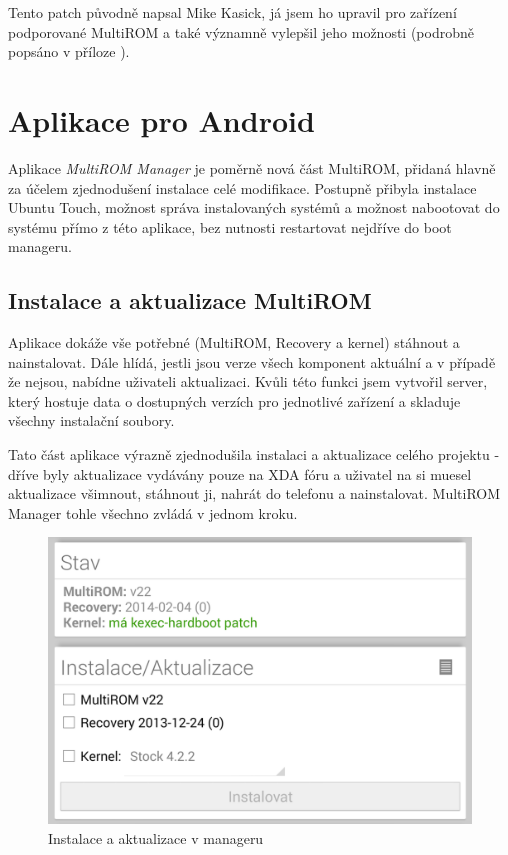 \documentclass[12pt, a4paper, oneside]{article}
\newcommand{\It}{\textit}  %
\begin{document}
Tento patch původně napsal Mike Kasick\cite{kexec-hardboot-orig}, já jsem ho upravil pro zařízení podporované MultiROM a také významně vylepšil jeho možnosti (podrobně popsáno v příloze ).

\section{Aplikace pro Android}
Aplikace \It{MultiROM Manager} je poměrně nová část MultiROM, přidaná hlavně za účelem zjednodušení instalace celé modifikace. Postupně přibyla instalace Ubuntu Touch, možnost správa instalovaných systémů a možnost nabootovat do systému přímo z této aplikace, bez nutnosti restartovat nejdříve do boot manageru.

\subsection{Instalace a aktualizace MultiROM}
Aplikace dokáže vše potřebné (MultiROM, Recovery a kernel) stáhnout a nainstalovat. Dále hlídá, jestli jsou verze všech komponent aktuální a v případě že nejsou, nabídne uživateli aktualizaci. Kvůli této funkci jsem vytvořil server, který hostuje data o dostupných verzích pro jednotlivé zařízení a skladuje všechny instalační soubory.

Tato část aplikace výrazně zjednodušila instalaci a aktualizace celého projektu - dříve byly aktualizace vydávány pouze na XDA fóru a uživatel na si muesel aktualizace všimnout, stáhnout ji, nahrát do telefonu a nainstalovat. MultiROM Manager tohle všechno zvládá v jednom kroku.

\begin{figure}[H]
\begin{center}
 \includegraphics[width=\textwidth]{img/mgr_install.png}
\caption{Instalace a aktualizace v manageru}
\end{center}
\end{figure}
\end{document}

